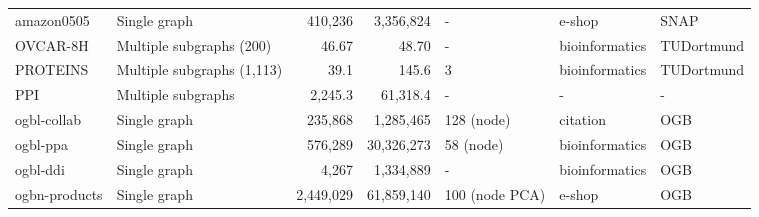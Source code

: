 \documentclass[11pt]{article}
\begin{document}
\begin{table}[htbp]
{\begin{tabular}{llrrlll}
    amazon0505 & Single graph & 410,236	& 3,356,824 & - & e-shop & SNAP \\
    OVCAR-8H & Multiple subgraphs (200) & 46.67 & 48.70 & - & bioinformatics & TUDortmund \\
    PROTEINS & Multiple subgraphs (1,113) & 39.1 & 145.6 & 3 & bioinformatics & TUDortmund \\
    PPI & Multiple subgraphs & 2,245.3 & 61,318.4 & - & - & - \\ 
    ogbl-collab & Single graph & 235,868 & 1,285,465 & 128 (node) & citation & OGB \\
    ogbl-ppa & Single graph & 576,289 & 30,326,273 & 58 (node) & bioinformatics & OGB \\
    ogbl-ddi & Single graph & 4,267 & 1,334,889 & - & bioinformatics & OGB \\
    ogbn-products & Single graph & 2,449,029 & 61,859,140 & 100 (node PCA) & e-shop & OGB \\
    \bottomrule
  \end{tabular}
}
\end{table}
\end{document}
